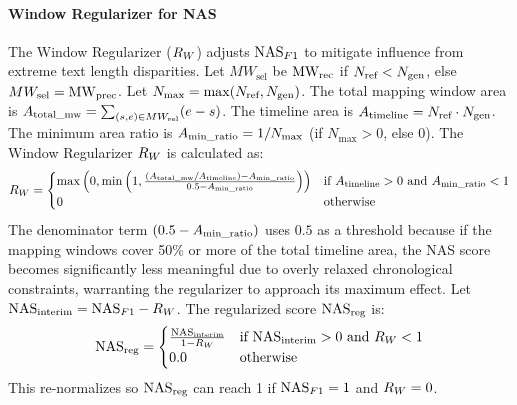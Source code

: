\paragraph{Window Regularizer for NAS} %
\label{sssec:window_regularizer_revised} %
The Window Regularizer ($R_W$) adjusts $\text{NAS}_{F1}$ to mitigate influence from extreme text length disparities.
Let $MW_{\text{sel}}$ be $\text{MW}_{\text{rec}}$ if $N_{\text{ref}} < N_{\text{gen}}$, else $MW_{\text{sel}} = \text{MW}_{\text{prec}}$.
Let $N_{\text{max}} = \max(N_{\text{ref}}, N_{\text{gen}})$.
The total mapping window area is $A_{\text{total\_mw}} = \sum_{(s,e) \in MW_{\text{sel}}} (e-s)$.
The timeline area is $A_{\text{timeline}} = N_{\text{ref}} \cdot N_{\text{gen}}$.
The minimum area ratio is $A_{\text{min\_ratio}} = 1/N_{\text{max}}$ (if $N_{\text{max}}>0$, else 0).
The Window Regularizer $R_W$ is calculated as:
\begin{equation}
R_W = 
\begin{cases}
\max\left(0, \min\left(1, \frac{(A_{\text{total\_mw}} / A_{\text{timeline}}) - A_{\text{min\_ratio}}}{0.5 - A_{\text{min\_ratio}}}\right)\right) & \text{if } A_{\text{timeline}} > 0 \text{ and } A_{\text{min\_ratio}} < 1 \\
0 & \text{otherwise}
\end{cases}
\end{equation}
The denominator term $(0.5 - A_{\text{min\_ratio}})$ uses $0.5$ as a threshold because if the mapping windows cover 50\% or more of the total timeline area, the NAS score becomes significantly less meaningful due to overly relaxed chronological constraints, warranting the regularizer to approach its maximum effect.
Let $\text{NAS}_{\text{interim}} = \text{NAS}_{F1} - R_W$. The regularized score $\text{NAS}_{\text{reg}}$ is:
\begin{equation} \label{eq:nas_reg_revised}
\text{NAS}_{\text{reg}} =
\begin{cases}
\frac{\text{NAS}_{\text{interim}}}{1 - R_W} & \text{if } \text{NAS}_{\text{interim}} > 0 \text{ and } R_W < 1 \\
0.0 & \text{otherwise}
\end{cases}
\end{equation}
This re-normalizes so $\text{NAS}_{\text{reg}}$ can reach 1 if $\text{NAS}_{F1}=1$ and $R_W=0$.

